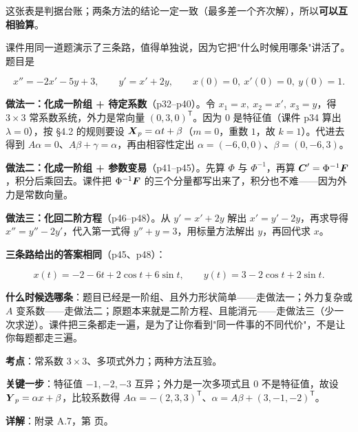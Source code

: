\documentclass[11pt]{ctexart}
\renewcommand{\qbreak}{\needspace{0.26\textheight}}
\begin{document}
这张表是判据台账；两条方法的结论一定一致（最多差一个齐次解），所以\textbf{可以互相验算}。


课件用同一道题演示了三条路，值得单独说，因为它把"什么时候用哪条"讲活了。题目是

\[
x''=-2x'-5y+3,\qquad y'=x'+2y,\qquad x(0)=0,\ x'(0)=0,\ y(0)=1 .
\]

\textbf{做法一：化成一阶组 + 待定系数}（p32--p40）。令 $x_1=x,\ x_2=x',\ x_3=y$，得 $3\times3$ 常系数系统，外力是常向量 $(0,3,0)^{\mathsf T}$。因为 $0$ 是特征值（课件 p34 算出 $\lambda=0$），按 §4.2 的规则要设 $\boldsymbol{X}_p=\alpha t+\beta$（$m=0$，重数 $1$，故 $k=1$）。代进去得到 $A\alpha=0$、$A\beta+\gamma=\alpha$，再由相容性定出 $\alpha=(-6,0,0)$、$\beta=(0,-6,3)$。

\textbf{做法二：化成一阶组 + 参数变易}（p41--p45）。先算 $\Phi$ 与 $\Phi^{-1}$，再算 $\boldsymbol{C}'=\Phi^{-1}\boldsymbol{F}$，积分后乘回去。课件把 $\Phi^{-1}\boldsymbol{F}$ 的三个分量都写出来了，积分也不难——因为外力是常数向量。

\textbf{做法三：化回二阶方程}（p46--p48）。从 $y'=x'+2y$ 解出 $x'=y'-2y$，再求导得 $x''=y''-2y'$，代入第一式得 $y''+y=3$，用标量方法解出 $y$，再回代求 $x$。

\textbf{三条路给出的答案相同}（p45、p48）：

\[
x(t)=-2-6t+2\cos t+6\sin t,\qquad y(t)=3-2\cos t+2\sin t .
\]

\textbf{什么时候选哪条}：题目已经是一阶组、且外力形状简单——走做法一；外力复杂或 $A$ 变系数——走做法二；原题本来就是二阶方程、且能消元——走做法三（少一次求逆）。课件把三条都走一遍，是为了让你看到"同一件事的不同代价"，不是让你每题都走三遍。


\qbreak
{}
\par\textbf{考点}：常系数 $3\times3$、多项式外力；两种方法互验。
\par\textbf{关键一步}：特征值 $-1,-2,-3$ 互异；外力是一次多项式且 $0$ 不是特征值，故设 $\boldsymbol{Y}_p=\alpha x+\beta$，比较系数得 $A\alpha=-(2,3,3)^{\mathsf T}$、$\alpha=A\beta+(3,-1,-2)^{\mathsf T}$。
\par\textbf{详解}：附录 A.7，第 \pageref{app:hw} 页。
\end{document}
